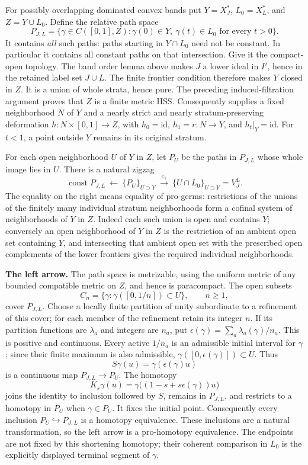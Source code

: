 \documentclass[11pt,a4paper]{article}
\theoremstyle{definition}
\begin{document}
For possibly overlapping dominated convex bands put
\(Y=X_J^*\), \(L_0=X_L^*\), and \(Z=Y\cup L_0\). Define the relative path space
\[
 P_{J,L}=\{\gamma\in C([0,1],Z):\gamma(0)\in Y,
                    \ \gamma(t)\in L_0\text{ for every }t>0\}.
\]
It contains \emph{all} such paths: paths starting in \(Y\cap L_0\) need not be constant. In particular it contains all constant paths on that intersection. Give it the compact-open topology. The band order lemma above makes \(J\) a lower ideal in \(I'\), hence in the retained label set \(J\cup L\). The finite frontier condition therefore makes \(Y\) closed in \(Z\). It is a union of whole strata, hence pure. The preceding induced-filtration argument proves that \(Z\) is a finite metric HSS. Consequently \cite[Proposition 3.2]{Quinn} supplies a fixed neighborhood \(N\) of \(Y\) and a nearly strict and nearly stratum-preserving deformation
\(h:N\times[0,1]\to Z\), with \(h_0=\mathrm{id}\), \(h_1=r:N\to Y\), and \(h_t|_Y=\mathrm{id}\). For \(t<1\), a point outside \(Y\) remains in its original stratum.

For each open neighborhood \(U\) of \(Y\) in \(Z\), let \(P_U\) be the paths in \(P_{J,L}\) whose whole image lies in \(U\). There is a natural zigzag
\[
 \operatorname{const} P_{J,L}
 \ \longleftarrow\ \{P_U\}_{U\supset Y}
 \ \xrightarrow{e_1}\ \{U\cap L_0\}_{U\supset Y}=V_J^L.
\]
The equality on the right means equality of pro-germs: restrictions of the unions of the finitely many individual stratum neighborhoods form a cofinal system of neighborhoods of \(Y\) in \(Z\). Indeed each such union is open and contains \(Y\); conversely an open neighborhood of \(Y\) in \(Z\) is the restriction of an ambient open set containing \(Y\), and intersecting that ambient open set with the prescribed open complements of the lower frontiers gives the required individual neighborhoods.

\textbf{The left arrow.} The path space is metrizable, using the uniform metric of any bounded compatible metric on \(Z\), and hence is paracompact. The open subsets
\[
 C_n=\{\gamma:\gamma([0,1/n])\subset U\},\qquad n\ge1,
\]
cover \(P_{J,L}\). Choose a locally finite partition of unity subordinate to a refinement of this cover; for each member of the refinement retain its integer \(n\). If its partition functions are \(\lambda_a\) and integers are \(n_a\), put
\(\epsilon(\gamma)=\sum_a\lambda_a(\gamma)/n_a\).
This is positive and continuous. Every active \(1/n_a\) is an admissible initial interval for \(\gamma\); since their finite maximum is also admissible, \(\gamma([0,\epsilon(\gamma)])\subset U\). Thus
\[
 S\gamma(u)=\gamma(\epsilon(\gamma)u)
\]
is a continuous map \(P_{J,L}\to P_U\). The homotopy
\[
 K_s\gamma(u)=\gamma\bigl((1-s+s\epsilon(\gamma))u\bigr)
\]
joins the identity to inclusion followed by \(S\), remains in \(P_{J,L}\), and restricts to a homotopy in \(P_U\) when \(\gamma\in P_U\). It fixes the initial point. Consequently every inclusion \(P_U\hookrightarrow P_{J,L}\) is a homotopy equivalence. These inclusions are a natural transformation, so the left arrow is a pro-homotopy equivalence. The endpoints are not fixed by this shortening homotopy; their coherent comparison in \(L_0\) is the explicitly displayed terminal segment of \(\gamma\).
\end{document}

